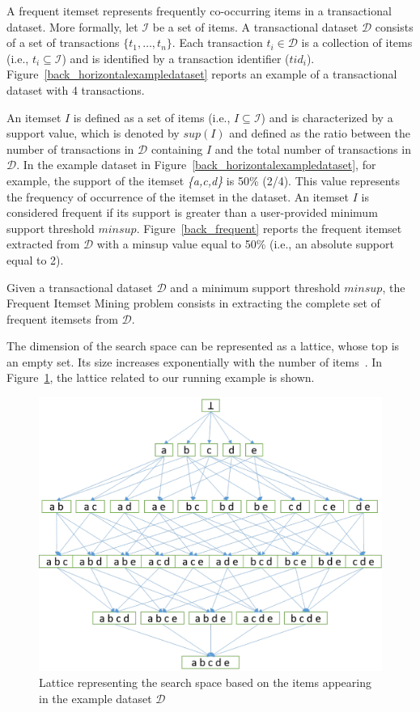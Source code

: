 \documentclass[preprint,review,12pt]{elsarticle}
\begin{document}
A frequent itemset represents frequently  co-occurring items in a transactional dataset. 
More formally, let $\mathcal{I}$ be a set of items. A transactional dataset $\mathcal{D}$
consists of a set of transactions $\{t_1, \dots, t_n\}$.
Each transaction $t_i\in \mathcal{D}$ is a collection of items
(i.e., $t_i\subseteq \mathcal{I}$)
and is identified by a transaction identifier ($tid_i$).
Figure~\ref{back_horizontalexampledataset} reports an example of a transactional
dataset with 4 transactions.


An itemset $I$ is defined as a set of items (i.e., $I\subseteq\mathcal{I}$)
and is characterized by a support value, which is denoted by $sup(I)$ and
defined as the ratio between the number of transactions in $\mathcal{D}$
containing $I$ and the total number of transactions in $\mathcal{D}$.
In the example dataset in Figure~\ref{back_horizontalexampledataset}, for example,
the support of the itemset \textit{\{a,c,d\}} is 50\% (2/4). This value represents the frequency of occurrence of the itemset in the dataset. An itemset $I$ is considered frequent if its support is greater than a
user-provided minimum support threshold $minsup$. Figure~\ref{back_frequent}
reports the frequent itemset extracted from $\mathcal{D}$ with a minsup value equal to 50\% (i.e., an absolute support equal to 2).

Given a transactional dataset $\mathcal{D}$ and a minimum support
threshold $minsup$, the Frequent Itemset Mining \cite{SurveyHan2007} problem
consists in extracting the complete set of frequent itemsets
from $\mathcal{D}$.

The dimension of the search space can be represented as a lattice, whose top is an empty set. Its size increases exponentially with the number of items~\cite{goethals2003survey}.
In Figure~\ref{lattice}, the lattice related to our running example is shown.

\begin{figure}[!t]
\includegraphics[width=5in]{lattices.eps}
\caption{Lattice representing the search space based on the items appearing in the example dataset $\mathcal{D}$}
\label{lattice}
\end{figure}
\end{document}
